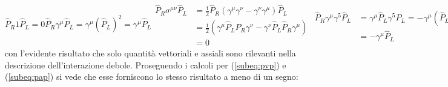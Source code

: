 \documentclass{subnucbo}
\begin{document}
\begin{subequations}
        \begin{equation}
                \hat { P } _ { R } 1  \hat { P } _ { L } = 0
                \label{subeq:psp}
        \end{equation}
        \begin{equation}
                \hat { P } _ { R } \gamma ^ { \mu } \hat { P } _ { L } = \gamma ^ { \mu } \left( \hat { P } _ { L } \right) ^ { 2 } = \gamma ^ { \mu } \hat { P } _ { L }
                \label{subeq:pvp}
        \end{equation}
        \begin{equation}
                \begin{aligned}
                        \hat { P } _ { R } \sigma ^ { \mu \nu } \hat { P } _ { L }  & = \frac { \mathrm { i } } { 2 } \hat { P } _ { R } \left( \gamma ^ { \mu } \gamma ^ { \nu } - \gamma ^ { \nu } \gamma ^ { \mu } \right) \hat { P } _ { L } \\ & = \frac { \mathrm { i } } { 2 } \left( \gamma ^ { \mu } \hat { P } _ { L } \hat { P } _ { R }  \gamma ^ { \nu } - \gamma ^ { \nu } \hat { P } _ { L } \hat { P } _ { R } \gamma ^ { \mu } \right) \\ & = 0
                \end{aligned}
                \label{subeq:ptp}
        \end{equation}
        \begin{equation}
                \begin{aligned}
                        \hat { P } _ { R } \gamma ^ { \mu } \gamma ^ { 5 } \hat { P } _ { L }  & = \gamma ^ { \mu } \hat { P } _ { L }  \gamma ^ { 5 } \hat { P } _ { L } = - \gamma ^ { \mu } \left( \hat { P } _ { L } \right) ^ { 2 } \\ & = - \gamma ^ { \mu } \hat { P } _ { L }
                \end{aligned}
                \label{subeq:pap}
        \end{equation}
        \begin{equation}
                \hat { P } _ { R } \gamma ^ { 5 } \hat { P } _ { L } = - \hat { P } _ { R } \hat { P } _ { L } = 0
                \label{subeq:ppp}
        \end{equation}
\end{subequations}
con l'evidente risultato che solo quantità vettoriali e assiali sono rilevanti nella descrizione dell'interazione debole. Proseguendo i calcoli per (\ref{subeq:pvp}) e (\ref{subeq:pap}) si vede che esse forniscono lo stesso risultato a meno di un segno:
\end{document}

